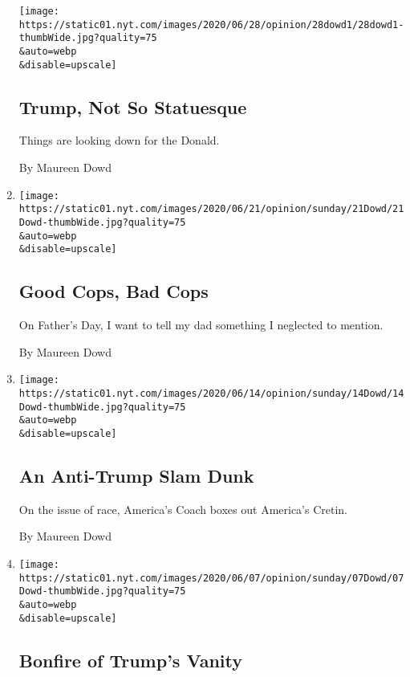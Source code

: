 \begin{enumerate}
  \texttt{[image: https://static01.nyt.com/images/2020/06/28/opinion/28dowd1/28dowd1-thumbWide.jpg?quality=75\\\&auto=webp\\\&disable=upscale]}

  \hypertarget{trump-not-so-statuesque}{%
  \subsection{Trump, Not So Statuesque}\label{trump-not-so-statuesque}}

  Things are looking down for the Donald.

  By Maureen Dowd
\item
  \href{/2020/06/20/opinion/sunday/police-good-cops-fathers-day.html}{}

  \texttt{[image: https://static01.nyt.com/images/2020/06/21/opinion/sunday/21Dowd/21Dowd-thumbWide.jpg?quality=75\\\&auto=webp\\\&disable=upscale]}

  \hypertarget{good-cops-bad-cops}{%
  \subsection{Good Cops, Bad Cops}\label{good-cops-bad-cops}}

  On Father's Day, I want to tell my dad something I neglected to
  mention.

  By Maureen Dowd
\item
  \href{/2020/06/13/opinion/sunday/gregg-popovich-trump-nba-protests.html}{}

  \texttt{[image: https://static01.nyt.com/images/2020/06/14/opinion/sunday/14Dowd/14Dowd-thumbWide.jpg?quality=75\\\&auto=webp\\\&disable=upscale]}

  \hypertarget{an-anti-trump-slam-dunk}{%
  \subsection{An Anti-Trump Slam Dunk}\label{an-anti-trump-slam-dunk}}

  On the issue of race, America's Coach boxes out America's Cretin.

  By Maureen Dowd
\item
  \href{/2020/06/06/opinion/trump-washington-monuments-george-floyd-protests.html}{}

  \texttt{[image: https://static01.nyt.com/images/2020/06/07/opinion/sunday/07Dowd/07Dowd-thumbWide.jpg?quality=75\\\&auto=webp\\\&disable=upscale]}

  \hypertarget{bonfire-of-trumps-vanity}{%
  \subsection{Bonfire of Trump's
  Vanity}\label{bonfire-of-trumps-vanity}}


\end{enumerate}
